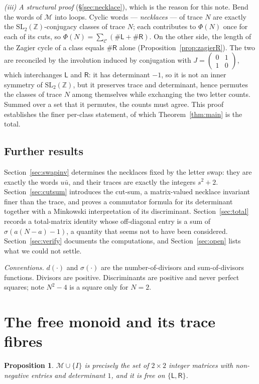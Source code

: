 \documentclass[11pt,reqno]{amsart}
\theoremstyle{plain}
\newtheorem{proposition}[theorem]{Proposition}
\theoremstyle{definition}
\newcommand{\Z}{\mathbb{Z}}
\newcommand{\Ll}{\mathsf{L}}
\newcommand{\Rr}{\mathsf{R}}
\newcommand{\Mon}{\mathcal{M}}
\newcommand{\SL}{\mathrm{SL}}
\newcommand{\sqm}[4]{\left(\begin{smallmatrix}#1&#2\\#3&#4\end{smallmatrix}\right)}
\begin{document}
\emph{(iii) A structural proof} (\S\ref{sec:necklace}), which is the reason for this
note. Bend the words of $\Mon$ into loops. Cyclic words --- \emph{necklaces} --- of
trace $N$ are exactly the $\SL_2(\Z)$-conjugacy classes of trace $N$; each contributes
to $\Phi(N)$ once for each of its cuts, so
$\Phi(N)=\sum_{\mathcal{C}}(\#\Ll+\#\Rr)$. On the other side, the length of the Zagier
cycle of a class equals $\#\Rr$ alone (Proposition~\ref{prop:zagierR}). The two are
reconciled by the involution induced by conjugation with $J=\sqm{0}{1}{1}{0}$, which
interchanges $\Ll$ and $\Rr$: it has determinant $-1$, so it is not an inner symmetry of
$\SL_2(\Z)$, but it preserves trace and determinant, hence permutes the classes of trace
$N$ among themselves while exchanging the two letter counts. Summed over a set that it
permutes, the counts must agree. This proof establishes the finer per-class statement,
of which Theorem~\ref{thm:main} is the total.

\subsection{Further results}
Section~\ref{sec:swapinv} determines the necklaces fixed by the letter swap: they are
exactly the words $u\bar u$, and their traces are exactly the integers $s^2+2$.
Section~\ref{sec:cutsum} introduces the cut-sum, a matrix-valued necklace invariant
finer than the trace, and proves a commutator formula for its determinant together with
a Minkowski interpretation of its discriminant. Section~\ref{sec:total} records a
total-matrix identity whose off-diagonal entry is a sum of $\sigma(a(N-a)-1)$, a
quantity that seems not to have been considered. Section~\ref{sec:verify} documents the
computations, and Section~\ref{sec:open} lists what we could not settle.

\medskip
\noindent\emph{Conventions.} $d(\cdot)$ and $\sigma(\cdot)$ are the number-of-divisors
and sum-of-divisors functions. Divisors are positive. Discriminants are positive and
never perfect squares; note $N^2-4$ is a square only for $N=2$.

\section{The free monoid and its trace fibres}\label{sec:monoid}

\begin{proposition}\label{prop:free}
$\Mon\cup\{I\}$ is precisely the set of $2\times2$ integer matrices with non-negative
entries and determinant $1$, and it is free on $\{\Ll,\Rr\}$.
\end{proposition}
\end{document}
